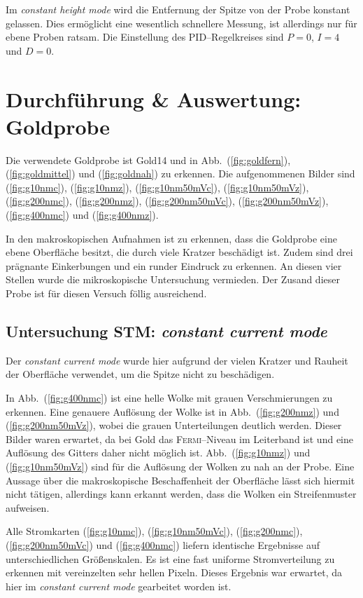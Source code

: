 \documentclass[sn-mathphys-num,iicol]{sn-jnl}
\theoremstyle{thmstyleone}
\theoremstyle{thmstyletwo}
\theoremstyle{thmstylethree}
\begin{document}
Im \textit{constant height mode} wird die Entfernung der Spitze von der Probe konstant gelassen.
Dies ermöglicht eine wesentlich schnellere Messung, ist allerdings nur für ebene Proben ratsam.
Die Einstellung des PID--Regelkreises sind $P=0$, $I=4$ und $D=0$.

\section{Durchführung \& Auswertung:\\Goldprobe}
Die verwendete Goldprobe ist \glqq Gold14\grqq{} und in Abb.\ (\ref{fig:goldfern}), (\ref{fig:goldmittel}) und (\ref{fig:goldnah}) zu erkennen.
Die aufgenommenen Bilder sind (\ref{fig:g10nmc}), (\ref{fig:g10nmz}), (\ref{fig:g10nm50mVc}), (\ref{fig:g10nm50mVz}), (\ref{fig:g200nmc}), (\ref{fig:g200nmz}), (\ref{fig:g200nm50mVc}), (\ref{fig:g200nm50mVz}), (\ref{fig:g400nmc}) und (\ref{fig:g400nmz}).

In den makroskopischen Aufnahmen ist zu erkennen, dass die Goldprobe eine ebene Oberfläche besitzt, die durch viele Kratzer beschädigt ist.
Zudem sind drei prägnante Einkerbungen und ein runder Eindruck zu erkennen.
An diesen vier Stellen wurde die mikroskopische Untersuchung vermieden. %
Der Zusand dieser Probe ist für diesen Versuch föllig ausreichend. %

\subsection{Untersuchung STM: \textit{constant current mode}}
Der \textit{constant current mode} wurde hier aufgrund der vielen Kratzer und Rauheit der Oberfläche verwendet, um die Spitze nicht zu beschädigen.

In Abb.\ (\ref{fig:g400nmc}) ist eine helle Wolke mit grauen Verschmierungen zu erkennen. 
Eine genauere Auflösung der Wolke ist in Abb.\ (\ref{fig:g200nmz}) und (\ref{fig:g200nm50mVz}), wobei die grauen Unterteilungen deutlich werden.
Dieser Bilder waren erwartet, da bei Gold das \textsc{Fermi}--Niveau im Leiterband ist und eine Auflösung des Gitters daher nicht möglich ist.
Abb.\ (\ref{fig:g10nmz}) und (\ref{fig:g10nm50mVz}) sind für die Auflösung der Wolken zu nah an der Probe.
Eine Aussage über die makroskopische Beschaffenheit der Oberfläche lässt sich hiermit nicht tätigen, allerdings kann erkannt werden, dass die Wolken ein Streifenmuster aufweisen.

Alle Stromkarten (\ref{fig:g10nmc}), (\ref{fig:g10nm50mVc}), (\ref{fig:g200nmc}), (\ref{fig:g200nm50mVc}) und (\ref{fig:g400nmc}) liefern identische Ergebnisse auf unterschiedlichen Größenskalen.
Es ist eine fast uniforme Stromverteilung zu erkennen mit vereinzelten sehr hellen Pixeln.
Dieses Ergebnis war erwartet, da hier im \textit{constant current mode} gearbeitet worden ist.
\end{document}
